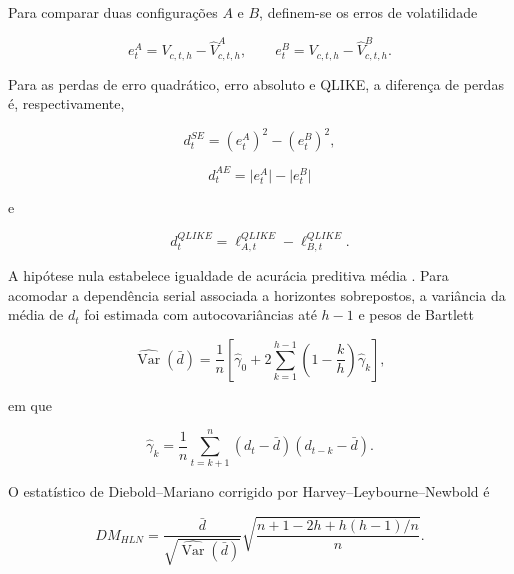 \documentclass[a4paper,fleqn]{cas-sc}
\begin{document}
Para comparar duas configurações \(A\) e \(B\), definem-se os erros de volatilidade

\begin{equation}
e^{A}_{t}=V_{c,t,h}-\widehat{V}^{A}_{c,t,h},
\qquad
e^{B}_{t}=V_{c,t,h}-\widehat{V}^{B}_{c,t,h}.
\label{eq:forecast_errors}
\end{equation}

Para as perdas de erro quadrático, erro absoluto e QLIKE, a diferença de perdas é, respectivamente,

\begin{equation}
d_t^{SE}=(e^{A}_{t})^{2}-(e^{B}_{t})^{2},
\label{eq:dm_se}
\end{equation}

\begin{equation}
d_t^{AE}=\lvert e^{A}_{t}\rvert-\lvert e^{B}_{t}\rvert
\label{eq:dm_ae}
\end{equation}

e

\begin{equation}
d_t^{QLIKE}
=
\ell^{QLIKE}_{A,t}-\ell^{QLIKE}_{B,t}.
\label{eq:dm_qlike}
\end{equation}

A hipótese nula estabelece igualdade de acurácia preditiva média \citep{DieboldMariano1995,HarveyLeybourneNewbold1997}. Para acomodar a dependência serial associada a horizontes sobrepostos, a variância da média de \(d_t\) foi estimada com autocovariâncias até \(h-1\) e pesos de Bartlett

\begin{equation}
\widehat{\operatorname{Var}}(\bar d)
=
\frac{1}{n}
\left[
\widehat{\gamma}_{0}
+2\sum_{k=1}^{h-1}
\left(1-\frac{k}{h}\right)\widehat{\gamma}_{k}
\right],
\label{eq:dm_variance}
\end{equation}

em que

\begin{equation}
\widehat{\gamma}_{k}
=
\frac{1}{n}
\sum_{t=k+1}^{n}
(d_t-\bar d)(d_{t-k}-\bar d).
\label{eq:dm_covariance}
\end{equation}

O estatístico de Diebold--Mariano corrigido por Harvey--Leybourne--Newbold é

\begin{equation}
DM_{HLN}
=
\frac{\bar d}{\sqrt{\widehat{\operatorname{Var}}(\bar d)}}
\sqrt{
\frac{n+1-2h+h(h-1)/n}{n}
}.
\label{eq:dm_hln}
\end{equation}
\end{document}
